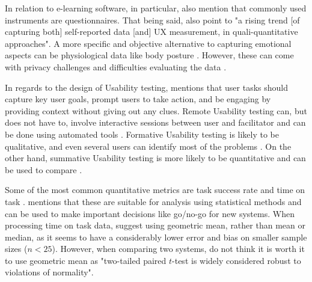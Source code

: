 In relation to e-learning software, in particular, \textcite{Darin_et_all_2019} also mention that commonly used instruments are questionnaires.
That being said, \textcite[p. 60]{Darin_et_all_2019} also point to "a rising trend [of capturing both] self-reported data [and] UX measurement, in quali-quantitative approaches".
A more specific and objective alternative to capturing emotional aspects can be physiological data like body posture \parencite{Tan_Schöning_Luyten_Coninx_2013}.
However, these can come with privacy challenges and difficulties evaluating the data \parencite{Juergen_et_all_2020}.

In regards to the design of Usability testing, \textcite{McCloskey_2014} mentions that user tasks should capture key user goals, prompt users to take action, and be engaging by providing context without giving out any clues.
Remote Usability testing can, but does not have to, involve interactive sessions between user and facilitator and can be done using automated tools \parencite{Moran_2019}.
Formative Usability testing is likely to be qualitative, and even several users can identify most of the problems \parencite{Lewis_2014,Moran_2019}.
On the other hand, summative Usability testing is more likely to be quantitative and can be used to compare \parencite{Macefield_2009, Moran_2019}.

Some of the most common quantitative metrics are task success rate and time on task \parencite{Macefield_2009, Moran_2019}.
\textcite{Macefield_2009} mentions that these are suitable for analysis using statistical methods and can be used to make important decisions like go/no-go for new systems.
When processing time on task data, \textcite{sauro_chapter3_2016} suggest using geometric mean, rather than mean or median, as it seems to have a considerably lower error and bias on smaller sample sizes ($n < 25$).
However, when comparing two systems, \textcite{sauro_chapter5_2016} do not think it is worth it to use geometric mean as "two-tailed paired $t$-test is widely considered robust to violations of normality".

